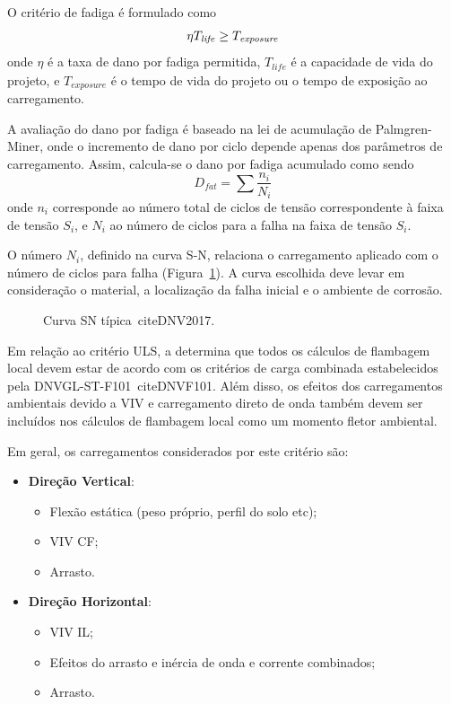 O critério de fadiga é formulado como
\begin{equation}
\label{eq:jdsn-eqfat}
\eta T_\mathit{life} \geq T_\mathit{exposure}\\
\end{equation}
onde $\eta$ é a taxa de dano por fadiga permitida, $T_\mathit{life}$ é a capacidade de vida do projeto, e
$T_\mathit{exposure}$ é o tempo de vida do projeto ou o tempo de exposição ao carregamento.

A avaliação do dano por fadiga é baseado na lei de acumulação de Palmgren-Miner, onde o incremento de dano por ciclo depende apenas dos parâmetros de carregamento.
Assim, calcula-se o dano por fadiga acumulado como sendo
\begin{equation}
\label{eq:jdsn-eqpm}
D_\mathit{fat} = \sum \frac{n_i}{N_i}
\end{equation}
onde $n_i$ corresponde ao número total de ciclos de tensão correspondente à faixa de tensão $S_i$, e $N_i$ ao número de ciclos para a falha na faixa de tensão $S_i$.

O número $N_i$, definido na curva S-N, relaciona o carregamento aplicado com o número de ciclos para falha (Figura~\ref{fig:jdsn-sncurve}).
A curva escolhida deve levar em consideração o material, a localização da falha inicial e o ambiente de corrosão.
\begin{figure}[hbt!]
\begin{center}
\caption{Curva SN típica~cite{DNV2017}.}
\label{fig:jdsn-sncurve}
\end{center}
\vspace{-0.7cm}
\end{figure}

\sloppy
Em relação ao critério ULS, a  determina que todos os cálculos de flambagem local devem estar de acordo com os critérios de carga combinada estabelecidos pela \mbox{DNVGL-ST-F101}~cite{DNVF101}.
Além disso, os efeitos dos carregamentos ambientais devido a VIV e carregamento direto de onda também devem ser incluídos nos cálculos de flambagem local como um momento fletor ambiental.

Em geral, os carregamentos considerados por este critério são:
\begin{itemize}
	\item \textbf{Direção Vertical}:
	\begin{itemize}
		\item Flexão estática (peso próprio, perfil do solo etc);
		\item VIV CF;
		\item Arrasto.
	\end{itemize}
	\item \textbf{Direção Horizontal}:
	\begin{itemize}
		\item VIV IL;
		\item Efeitos do arrasto e inércia de onda e corrente combinados;
		\item Arrasto.
	\end{itemize}
\end{itemize}


